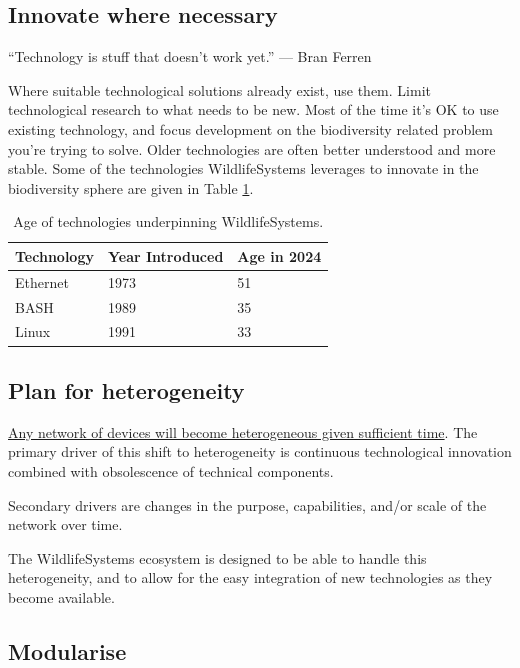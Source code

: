 \documentclass[
]{book}
\begin{document}
\subsection{Innovate where necessary}\label{innovate-where-necessary}

``Technology is stuff that doesn't work yet.''
\hfill --- Bran Ferren

Where suitable technological solutions already exist, use them. Limit technological research to what needs to be new. Most of the time it's OK to use existing technology, and focus development on the biodiversity related problem you're trying to solve. Older technologies are often better understood and more stable. Some of the technologies WildlifeSystems leverages to innovate in the biodiversity sphere are given in Table \ref{tab:tech-age}.

\begin{table}

\caption{\label{tab:tech-age}Age of technologies underpinning WildlifeSystems.}
\centering
\begin{tabular}[t]{l|l|l}
\hline
Technology & Year Introduced & Age in  2024\\
\hline
Ethernet & 1973 & 51\\
\hline
BASH & 1989 & 35\\
\hline
Linux & 1991 & 33\\
\hline
\end{tabular}
\end{table}

\subsection{Plan for heterogeneity}\label{plan-for-heterogeneity}

\href{https://medium.ebaker.me.uk/sensor-networks1-abstracting-heterogeneity-319c0c41c9fa}{Any network of devices will become heterogeneous given sufficient time}. The primary driver of this shift to heterogeneity is continuous technological innovation combined with obsolescence of technical components.

Secondary drivers are changes in the purpose, capabilities, and/or scale of the network over time.

The WildlifeSystems ecosystem is designed to be able to handle this heterogeneity, and to allow for the easy integration of new technologies as they become available.

\subsection{Modularise}\label{modularise}
\end{document}
